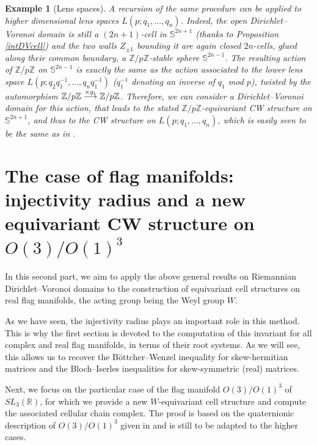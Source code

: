 \documentclass[11pt,twoside]{amsart}
\theoremstyle{plain}
\newtheorem{exemple}[prop]{Example}
\newcommand{\R}{{\mathbb R}}
\newcommand{\Z}{{\mathbb Z}}
\newcommand{\longto}{\longrightarrow}
\newcommand{\Sph}{\mathbb{S}}
\begin{document}
\begin{exemple}[Lens spaces]
A recursion of the same procedure can be applied to higher dimensional lens spaces $L(p;q_1,\dotsc,q_n)$. Indeed, the open Dirichlet--Voronoi domain is still a $(2n+1)$-cell in $\Sph^{2n+1}$ (thanks to Proposition \ref{intDVcell}) and the two walls $Z_{\pm1}$ bounding it are again closed $2n$-cells, glued along their common boundary, a $\Z/p\Z$-stable sphere $\Sph^{2n-1}$. The resulting action of $\Z/p\Z$ on $\Sph^{2n-1}$ is exactly the same as the action associated to the lower lens space $L(p;q_2q_1^{-1},\dotsc,q_nq_1^{-1})$ ($q_1^{-1}$ denoting an inverse of $q_1$ mod $p$), twisted by the automorphism $\Z/p\Z\stackrel{\tiny{\times q_1}}\longto\Z/p\Z$. Therefore, we can consider a Dirichlet--Voronoi domain for this action, that leads to the stated $\Z/p\Z$-equivariant CW structure on $\Sph^{2n+1}$, and thus to the CW structure on $L(p;q_1,\dotsc,q_n)$, which is easily seen to be the same as in \cite{hatcher}.
\end{exemple}











\part{The case of flag manifolds: injectivity radius and a new equivariant CW structure on $O(3)/O(1)^3$}

In this second part, we aim to apply the above general results on Riemannian Dirichlet--Voronoi domains to the construction of equivariant cell structures on real flag manifolds, the acting group being the Weyl group $W$.

As we have seen, the injectivity radius plays an important role in this method. This is why the first section is devoted to the computation of this invariant for all complex and real flag manifolds, in terms of their root systems. As we will see, this allows us to recover the B\"{o}ttcher--Wenzel inequality \cite{bottcher-wenzel} for skew-hermitian matrices and the Bloch--Iserles inequalities \cite{bloch-iserles} for skew-symmetric (real) matrices.

Next, we focus on the particular case of the flag manifold $O(3)/O(1)^3$ of $SL_3(\R)$, for which we provide a new $W$-equivariant cell structure and compute the associated cellular chain complex. The proof is based on the quaternionic description of $O(3)/O(1)^3$ given in \cite[\S 4.4]{chirivi-garnier-spreafico} and is still to be adapted to the higher cases.
\end{document}
